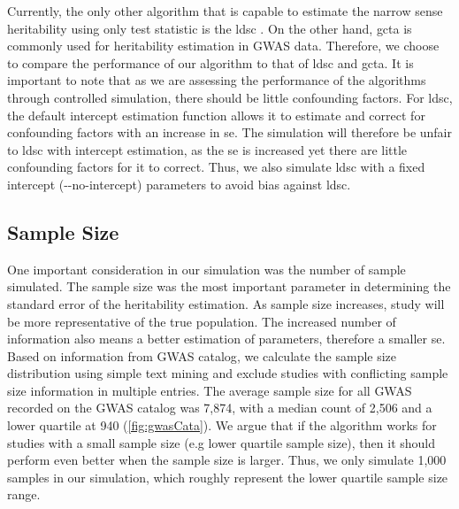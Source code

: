 		Currently, the only other algorithm that is capable to estimate the narrow sense heritability using only test statistic is the \gls{ldsc} \citep{Bulik-Sullivan2015}. 
		On the other hand, \gls{gcta} \citep{Yang2011} is commonly used for heritability estimation in \gls{GWAS} data. 
		Therefore, we choose to compare the performance of our algorithm to that of \gls{ldsc} and \gls{gcta}.
		It is important to note that as we are assessing the performance of the algorithms through controlled simulation, there should be little confounding factors. 
		For \gls{ldsc}, the default intercept estimation function allows it to estimate and correct for confounding factors with an increase in \gls{se}. 
		The simulation will therefore be unfair to \gls{ldsc} with intercept estimation, as the \gls{se} is increased yet there are little confounding factors for it to correct.
		Thus, we also simulate \gls{ldsc} with a fixed intercept (-{}-no-intercept) parameters to avoid bias against \gls{ldsc}.	
		
		\subsection{Sample Size}
			One important consideration in our simulation was the number of sample simulated. 
			The sample size was the most important parameter in determining the standard error of the heritability estimation. 
			As sample size increases, study will be more representative of the true population. 
			The increased number of information also means a better estimation of parameters, therefore a smaller \acrfull{se}.
			Based on information from \gls{GWAS} catalog\citep{Welter2014}, we calculate the sample size distribution using simple text mining and exclude studies with conflicting sample size information in multiple entries. 
			The average sample size for all \gls{GWAS} recorded on the \gls{GWAS} catalog was 7,874, with a median count of 2,506 and a lower quartile at 940 (\cref{fig:gwasCata}). 
			We argue that if the algorithm works for studies with a small sample size (e.g lower quartile sample size), then it should perform even better when the sample size is larger. 
			Thus, we only simulate 1,000 samples in our simulation, which roughly represent the lower quartile sample size range.
				
